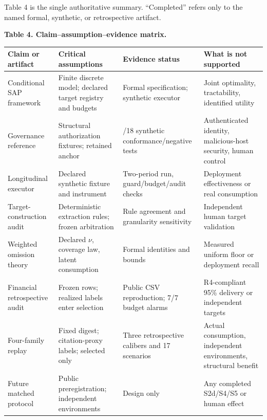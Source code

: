 \documentclass[
  11pt]{article}
\begin{document}
Table 4 is the single authoritative summary. ``Completed'' refers only
to the named formal, synthetic, or retrospective artifact.

\textbf{Table 4. Claim--assumption--evidence matrix.}

\begin{longtable}[]{@{}
  >{\raggedright\arraybackslash}p{}
  >{\raggedright\arraybackslash}p{}
  >{\raggedright\arraybackslash}p{}
  >{\raggedright\arraybackslash}p{}@{}}
\toprule\noalign{}
\begin{minipage}[b]{\linewidth}\raggedright
Claim or artifact
\end{minipage} & \begin{minipage}[b]{\linewidth}\raggedright
Critical assumptions
\end{minipage} & \begin{minipage}[b]{\linewidth}\raggedright
Evidence status
\end{minipage} & \begin{minipage}[b]{\linewidth}\raggedright
What is not supported
\end{minipage} \\
\midrule\noalign{}
\endhead
\bottomrule\noalign{}
\endlastfoot
Conditional SAP framework & Finite discrete model; declared target
registry and budgets & Formal specification; synthetic executor & Joint
optimality, tractability, identified utility \\
Governance reference & Structural authorization fixtures; retained
anchor & 18/18 synthetic conformance/negative tests & Authenticated
identity, malicious-host security, human control \\
Longitudinal executor & Declared synthetic fixture and instrument &
Two-period run, guard/budget/audit checks & Deployment effectiveness or
real consumption \\
Target-construction audit & Deterministic extraction rules; frozen
arbitration & Rule agreement and granularity sensitivity & Independent
human target validation \\
Weighted omission theory & Declared \(\nu\), coverage law, latent
consumption & Formal identities and bounds & Measured uniform floor or
deployment recall \\
Financial retrospective audit & Frozen rows; realized labels enter
selection & Public CSV reproduction; 7/7 budget alarms & R4-compliant
95\% delivery or independent targets \\
Four-family replay & Fixed digest; citation-proxy labels; selected only
& Three retrospective calibers and 17 scenarios & Actual consumption,
independent environments, structural benefit \\
Future matched protocol & Public preregistration; independent
environments & Design only & Any completed S2d/S4/S5 or human effect \\
\end{longtable}
\end{document}
